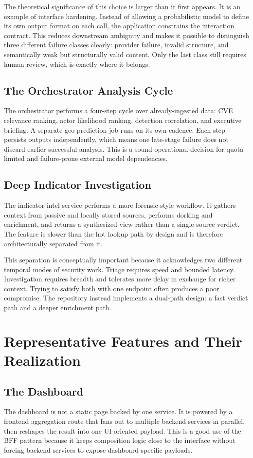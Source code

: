 The theoretical significance of this choice is larger than it first appears. It is an example of interface hardening. Instead of allowing a probabilistic model to define its own output format on each call, the application constrains the interaction contract. This reduces downstream ambiguity and makes it possible to distinguish three different failure classes clearly: provider failure, invalid structure, and semantically weak but structurally valid content. Only the last class still requires human review, which is exactly where it belongs.

\subsection{The Orchestrator Analysis Cycle}
The orchestrator performs a four-step cycle over already-ingested data: CVE relevance ranking, actor likelihood ranking, detection correlation, and executive briefing. A separate geo-prediction job runs on its own cadence. Each step persists outputs independently, which means one late-stage failure does not discard earlier successful analysis. This is a sound operational decision for quota-limited and failure-prone external model dependencies.

\subsection{Deep Indicator Investigation}
The indicator-intel service performs a more forensic-style workflow. It gathers context from passive and locally stored sources, performs dorking and enrichment, and returns a synthesized view rather than a single-source verdict. The feature is slower than the hot lookup path by design and is therefore architecturally separated from it.

This separation is conceptually important because it acknowledges two different temporal modes of security work. Triage requires speed and bounded latency. Investigation requires breadth and tolerates more delay in exchange for richer context. Trying to satisfy both with one endpoint often produces a poor compromise. The repository instead implements a dual-path design: a fast verdict path and a deeper enrichment path.

\section{Representative Features and Their Realization}
\subsection{The Dashboard}
The dashboard is not a static page backed by one service. It is powered by a frontend aggregation route that fans out to multiple backend services in parallel, then reshapes the result into one UI-oriented payload. This is a good use of the BFF pattern because it keeps composition logic close to the interface without forcing backend services to expose dashboard-specific payloads.

